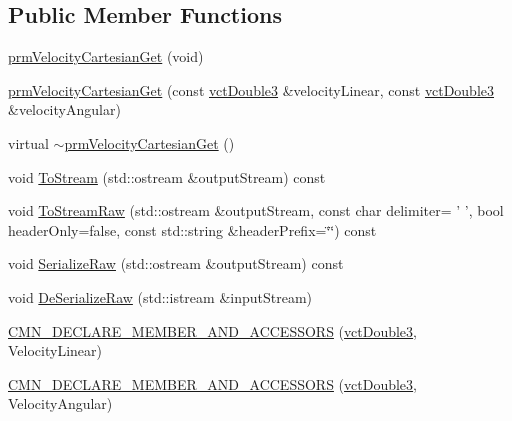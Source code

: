 \subsection*{Public Member Functions}
\begin{DoxyCompactItemize}
\item 
\hyperlink{classprm_velocity_cartesian_get_af45384ae63b5ec9c61b44f5e548f495d}{prm\-Velocity\-Cartesian\-Get} (void)
\item 
\hyperlink{classprm_velocity_cartesian_get_a9e0b16ad9053ce1fc8660982132ed922}{prm\-Velocity\-Cartesian\-Get} (const \hyperlink{vct_fixed_size_vector_types_8h_a4a89122c9d7f72c3f31fe8126e17c3af}{vct\-Double3} \&velocity\-Linear, const \hyperlink{vct_fixed_size_vector_types_8h_a4a89122c9d7f72c3f31fe8126e17c3af}{vct\-Double3} \&velocity\-Angular)
\item 
virtual \hyperlink{classprm_velocity_cartesian_get_aec3fd887c57e37f1c212254ab8f71d30}{$\sim$prm\-Velocity\-Cartesian\-Get} ()
\item 
void \hyperlink{classprm_velocity_cartesian_get_ae778e27fbff2f9f282fe9257365bd242}{To\-Stream} (std\-::ostream \&output\-Stream) const 
\item 
void \hyperlink{classprm_velocity_cartesian_get_a92c966314ca5955b4bf458fa6214fff4}{To\-Stream\-Raw} (std\-::ostream \&output\-Stream, const char delimiter= ' ', bool header\-Only=false, const std\-::string \&header\-Prefix=\char`\"{}\char`\"{}) const 
\item 
void \hyperlink{classprm_velocity_cartesian_get_a824a30ec6ced9a51038613ca5b0205e9}{Serialize\-Raw} (std\-::ostream \&output\-Stream) const 
\item 
void \hyperlink{classprm_velocity_cartesian_get_a680e5b900806f0d8a3b1139d6182fd7d}{De\-Serialize\-Raw} (std\-::istream \&input\-Stream)
\end{DoxyCompactItemize}
{\bf }\par
\begin{DoxyCompactItemize}
\item 
\hyperlink{classprm_velocity_cartesian_get_a6a28bbd169f0ec0fdaa6babb183db3f2}{C\-M\-N\-\_\-\-D\-E\-C\-L\-A\-R\-E\-\_\-\-M\-E\-M\-B\-E\-R\-\_\-\-A\-N\-D\-\_\-\-A\-C\-C\-E\-S\-S\-O\-R\-S} (\hyperlink{vct_fixed_size_vector_types_8h_a4a89122c9d7f72c3f31fe8126e17c3af}{vct\-Double3}, Velocity\-Linear)
\end{DoxyCompactItemize}

{\bf }\par
\begin{DoxyCompactItemize}
\item 
\hyperlink{classprm_velocity_cartesian_get_ad370a42517e1ace185abdfa0fd6c5ab1}{C\-M\-N\-\_\-\-D\-E\-C\-L\-A\-R\-E\-\_\-\-M\-E\-M\-B\-E\-R\-\_\-\-A\-N\-D\-\_\-\-A\-C\-C\-E\-S\-S\-O\-R\-S} (\hyperlink{vct_fixed_size_vector_types_8h_a4a89122c9d7f72c3f31fe8126e17c3af}{vct\-Double3}, Velocity\-Angular)
\end{DoxyCompactItemize}

